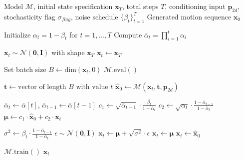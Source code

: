 \begin{algorithm}
\caption{Reverse Denoising Sampling}
\label{alg:reverse_denoising}
\begin{algorithmic}[1]
\Require Model $\mathcal{M}$, initial state specification $\mathbf{x}_T$, total steps $T$, conditioning input $\mathbf{p}_{2d}$, stochasticity flag $\sigma_{flag}$, noise schedule $\{\beta_t\}_{t=1}^T$
\Ensure Generated motion sequence $\mathbf{x}_0$

\State Initialize $\alpha_t = 1 - \beta_t$ for $t = 1,\dots,T$
\State Compute $\bar{\alpha}_t = \prod_{i=1}^{t} \alpha_i$ 

    \State $\mathbf{x}_t \sim \mathcal{N}(\mathbf{0}, \mathbf{I})$ with shape $\mathbf{x}_T$
\Else
    \State $\mathbf{x}_t \leftarrow \mathbf{x}_T$ 
\EndIf

\State Set batch size $B \leftarrow \text{dim}(\mathbf{x}_t, 0)$
\State $\mathcal{M}.\text{eval}()$ 

    \State $\mathbf{t} \leftarrow \text{vector of length } B \text{ with value } t$ 
    \State $\hat{\mathbf{x}}_0 \leftarrow \mathcal{M}(\mathbf{x}_t, \mathbf{t}, \mathbf{p}_{2d})$ 

        \State $\bar{\alpha}_t \leftarrow \bar{\alpha}[t]$, $\bar{\alpha}_{t-1} \leftarrow \bar{\alpha}[t-1]$
        \State $c_1 \leftarrow \sqrt{\bar{\alpha}_{t-1}} \cdot \frac{\beta_t}{1 - \bar{\alpha}_t}$
        \State $c_2 \leftarrow \sqrt{\alpha_t} \cdot \frac{1 - \bar{\alpha}_{t-1}}{1 - \bar{\alpha}_t}$
        \State $\boldsymbol{\mu} \leftarrow c_1 \cdot \hat{\mathbf{x}}_0 + c_2 \cdot \mathbf{x}_t$ 

            \State $\sigma^2 \leftarrow \beta_t \cdot \frac{1 - \bar{\alpha}_{t-1}}{1 - \bar{\alpha}_t}$ 
            \State $\epsilon \sim \mathcal{N}(\mathbf{0}, \mathbf{I})$
            \State $\mathbf{x}_t \leftarrow \boldsymbol{\mu} + \sqrt{\sigma^2} \cdot \epsilon$ 
        \Else
            \State $\mathbf{x}_t \leftarrow \boldsymbol{\mu}$ 
        \EndIf
    \Else
        \State $\mathbf{x}_t \leftarrow \hat{\mathbf{x}}_0$ 
    \EndIf
\EndFor

\State $\mathcal{M}.\text{train}()$ 
\State \Return $\mathbf{x}_t$
\end{algorithmic}
\end{algorithm}

